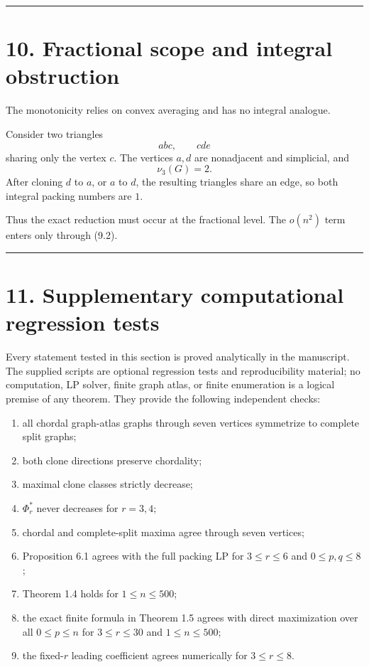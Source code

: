 \documentclass[11pt,a4paper]{article}
\providecommand{\tightlist}{\setlength{\itemsep}{0pt}\setlength{\parskip}{0pt}}
\begin{document}
\begin{center}\rule{0.5\linewidth}{0.5pt}\end{center}

\section{10. Fractional scope and integral obstruction}\label{fractional-scope-and-integral-obstruction}

The monotonicity relies on convex averaging and has no integral analogue.

Consider two triangles
\[
abc,\qquad cde
\]
sharing only the vertex \(c\). The vertices \(a,d\) are nonadjacent and
simplicial, and
\[
\nu_3(G)=2.
\]
After cloning \(d\) to \(a\), or \(a\) to \(d\), the resulting triangles
share an edge, so both integral packing numbers are \(1\).

Thus the exact reduction must occur at the fractional level. The
\(o(n^2)\) term enters only through (9.2).

\begin{center}\rule{0.5\linewidth}{0.5pt}\end{center}

\section{11. Supplementary computational regression tests}\label{supplementary-computational-regression-tests}

Every statement tested in this section is proved analytically in the
manuscript. The supplied scripts are optional regression tests and
reproducibility material; no computation, LP solver, finite graph atlas, or
finite enumeration is a logical premise of any theorem. They provide the
following independent checks:

\begin{enumerate}
\def\labelenumi{\arabic{enumi}.}
\tightlist
\item
  all chordal graph-atlas graphs through seven vertices symmetrize to
  complete split graphs;
\item
  both clone directions preserve chordality;
\item
  maximal clone classes strictly decrease;
\item
  \(\Phi_r^*\) never decreases for \(r=3,4\);
\item
  chordal and complete-split maxima agree through seven vertices;
\item
  Proposition 6.1 agrees with the full packing LP for
  \(3\le r\le6\) and \(0\le p,q\le8\);
\item
  Theorem 1.4 holds for \(1\le n\le500\);
\item
  the exact finite formula in Theorem 1.5 agrees with direct maximization
  over all \(0\le p\le n\) for \(3\le r\le30\) and \(1\le n\le500\);
\item
  the fixed-\(r\) leading coefficient agrees numerically for
  \(3\le r\le8\).
\end{enumerate}
\end{document}
